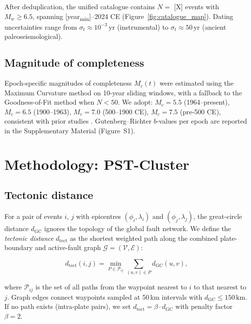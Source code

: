 \documentclass[draft]{agujournal2019}
\begin{document}
After deduplication, the unified catalogue contains $N = $ [X] events with
$M_w \geq 6.5$, spanning [year\textsubscript{min}]–2024 CE
(Figure~\ref{fig:catalogue_map}).  Dating uncertainties range from
$\sigma_t \approx 10^{-3}\,\text{yr}$ (instrumental) to $\sigma_t \approx 50\,\text{yr}$
(ancient paleoseismological).

\subsection{Magnitude of completeness}

Epoch-specific magnitudes of completeness $M_c(t)$ were estimated using the
Maximum Curvature method \citep{Wiemer2000} on 10-year sliding windows, with
a fallback to the Goodness-of-Fit method \citep{Wiemer2000b} when $N < 50$.
We adopt: $M_c = 5.5$ (1964–present), $M_c = 6.5$ (1900–1963), $M_c = 7.0$
(500–1900 CE), $M_c = 7.5$ (pre-500 CE), consistent with prior studies
\citep{Engdahl2002, Albini2013}.  Gutenberg–Richter $b$-values per epoch are
reported in the Supplementary Material (Figure~S1).

\section{Methodology: PST-Cluster}
\label{sec:method}

\subsection{Tectonic distance}

For a pair of events $i$, $j$ with epicentres $(\phi_i, \lambda_i)$ and
$(\phi_j, \lambda_j)$, the great-circle distance $d_\mathrm{GC}$ ignores
the topology of the global fault network.  We define the \textit{tectonic
distance} $d_\mathrm{tect}$ as the shortest weighted path along the combined
plate-boundary and active-fault graph $\mathcal{G} = (\mathcal{V}, \mathcal{E})$:

\begin{equation}
  d_\mathrm{tect}(i,j) = \min_{P \in \mathcal{P}_{ij}}
  \sum_{(u,v) \in P} d_\mathrm{GC}(u,v),
  \label{eq:tect_dist}
\end{equation}

where $\mathcal{P}_{ij}$ is the set of all paths from the waypoint nearest
to $i$ to that nearest to $j$.  Graph edges connect waypoints sampled at
50\,km intervals with $d_\mathrm{GC} \leq 150\,\text{km}$.  If no path
exists (intra-plate pairs), we set $d_\mathrm{tect} = \beta \cdot d_\mathrm{GC}$
with penalty factor $\beta = 2$.
\end{document}
